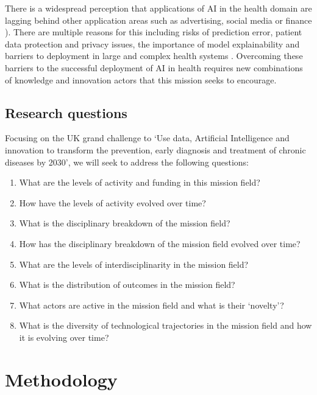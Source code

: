 \documentclass[11pt]{article}
\begin{document}
There is a widespread perception that applications of AI in the health domain are lagging behind other application areas such as advertising, social media or finance \citep{mulgan_artificial_2018, mateos-garcia_complex_2018}). There are multiple reasons for this including risks of prediction error, patient data protection and privacy issues, the importance of model explainability and barriers to deployment in large and complex health systems \citep{miotto2017deep}. Overcoming these barriers to the successful deployment of AI in health requires new combinations of knowledge and innovation actors that this mission seeks to encourage.

\subsection{Research questions}
\label{subsec: questions}

Focusing on the UK grand challenge to `Use data, Artificial Intelligence and innovation to transform the prevention, early diagnosis and treatment of chronic diseases by 2030', we will seek to address the following questions:

\begin{enumerate}
    \item What are the levels of activity and funding in this mission field?
    \item How have the levels of activity evolved over time?
    \item What is the disciplinary breakdown of the mission field?
    \item How has the disciplinary breakdown of the mission field evolved over time?
    \item What are the levels of interdisciplinarity in the mission field?
    \item What is the distribution of outcomes in the mission field?
    \item What actors are active in the mission field and what is their `novelty’?
    \item What is the diversity of technological trajectories in the mission field and how it is evolving over time?

\end{enumerate}

\section{Methodology}
\label{sec:methodology}
\end{document}
